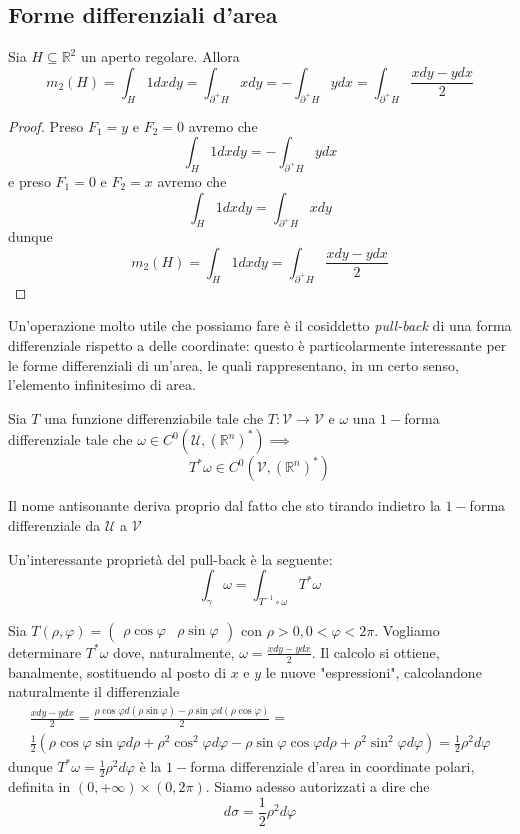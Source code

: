 \subsection{Forme differenziali d'area}
\begin{prop}
	Sia $H \subseteq \mathbb{R}^2$ un aperto regolare. Allora
	$$
	m_2(H) = \int_H 1dxdy = \int_{\partial^{+} H} xdy = - \int_{\partial^{+} H} ydx = \int_{\partial^{+} H}	 \frac{xdy - ydx}{2}
	$$
\end{prop}
\begin{proof}
Preso $F_1=y$ e $F_2 = 0$ avremo che
$$
\int_H 1dxdy = -\int_{\partial^{+} H} ydx
$$
e preso $F_1 = 0$ e $F_2 = x$ avremo che
$$
\int_H 1dxdy = \int_{\partial^{+} H} xdy
$$
dunque
$$
m_2(H) = \int_H 1dxdy = \int_{\partial^{+} H} \frac{xdy - ydx}{2} 
$$
\end{proof}
Un'operazione molto utile che possiamo fare è il cosiddetto \emph{pull-back} di una forma differenziale rispetto a delle coordinate: questo è particolarmente interessante per le forme differenziali di un'area, le quali rappresentano, in un certo senso, l'elemento infinitesimo di area.
\begin{definition}
	Sia $T$ una funzione differenziabile tale che $T: \mathcal{V} \to \mathcal{V}$ e $\omega$ una $1-$forma differenziale tale che $\omega \in C^0(\mathcal{U}, (\mathbb{R}^n)^*) \implies$
	$$
	T^*\omega \in C^0(\mathcal{V}, (\mathbb{R}^n)^*)
	$$
\end{definition}
\begin{remark}
	Il nome antisonante deriva proprio dal fatto che sto tirando indietro la $1-$forma differenziale da $\mathcal{U}$ a $\mathcal{V}$
\end{remark}
Un'interessante proprietà del pull-back è la seguente:
$$
\int_\gamma \omega = \int_{T^{-1} \circ \omega} T^*\omega
$$
\begin{example}
	Sia $T(\rho, \varphi) = \begin{pmatrix}	\rho \cos{\varphi} & \rho \sin{\varphi} \end{pmatrix}$ con $\rho > 0, 0 < \varphi < 2\pi$. Vogliamo determinare $T^*\omega$ dove, naturalmente, $\omega = \frac{xdy-ydx}{2}$. Il calcolo si ottiene, banalmente, sostituendo al posto di $x$ e $y$ le nuove "espressioni", calcolandone
	naturalmente il differenziale
	\begin{align*}
	&\frac{xdy - ydx}{2} = \frac{\rho \cos{\varphi} d(\rho \sin{\varphi}) - \rho \sin{\varphi} d(\rho \cos{\varphi})}{2} = & \\ 
	&\frac{1}{2} \left( \rho \cos{\varphi} \sin{\varphi} d\rho + \rho^2 \cos^2{\varphi} d\varphi - \rho \sin{\varphi} \cos{\varphi} d\rho + \rho^2 \sin^2{\varphi} d\varphi \right) = \frac{1}{2} \rho^2 d\varphi
	\end{align*}
	dunque $T^*\omega = \frac{1}{2} \rho^2 d\varphi$ è la $1-$forma differenziale d'area in coordinate polari, definita in $(0, +\infty) \times (0, 2\pi)$. Siamo adesso autorizzati a dire che
	$$
	d\sigma = \frac{1}{2} \rho^2 d\varphi
	$$
\end{example}
